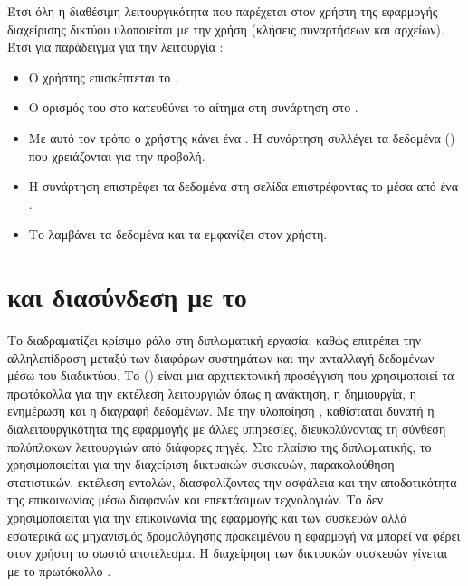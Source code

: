 \FloatBarrier

Έτσι όλη η διαθέσιμη λειτουργικότητα που παρέχεται στον χρήστη της εφαρμογής διαχείρισης δικτύου υλοποιείται με την χρήση  (κλήσεις συναρτήσεων και  αρχείων). Έτσι για παράδειγμα για την λειτουργία  : 

\begin{itemize}
    \item Ο χρήστης επισκέπτεται το  . 
    \item Ο ορισμός του  στο  κατευθύνει το αίτημα στη συνάρτηση  στο .
    \item Με αυτό τον τρόπο ο χρήστης κάνει ένα . Η συνάρτηση  συλλέγει τα δεδομένα () που χρειάζονται για την προβολή.
    \item Η συνάρτηση  επιστρέφει τα δεδομένα στη σελίδα  επιστρέφοντας το μέσα από ένα .
    \item Το   λαμβάνει τα δεδομένα και τα εμφανίζει στον χρήστη.
\end{itemize}


\section{ και διασύνδεση με το }

 Το  διαδραματίζει κρίσιμο ρόλο στη 
διπλωματική εργασία, καθώς επιτρέπει την αλληλεπίδραση μεταξύ των 
διαφόρων συστημάτων και την ανταλλαγή δεδομένων μέσω του διαδικτύου. 
Το  () είναι μια 
αρχιτεκτονική προσέγγιση που χρησιμοποιεί τα πρωτόκολλα  
για την εκτέλεση λειτουργιών όπως η ανάκτηση, η δημιουργία, η 
ενημέρωση και η διαγραφή δεδομένων. Με την υλοποίηση , 
καθίσταται δυνατή η διαλειτουργικότητα της εφαρμογής με άλλες 
υπηρεσίες, διευκολύνοντας τη σύνθεση πολύπλοκων λειτουργιών από 
διάφορες πηγές. Στο πλαίσιο της διπλωματικής, το  
χρησιμοποιείται για την διαχείριση δικτυακών συσκευών, παρακολούθηση 
στατιστικών, εκτέλεση εντολών, διασφαλίζοντας την ασφάλεια και την 
αποδοτικότητα της επικοινωνίας μέσω διαφανών και επεκτάσιμων 
τεχνολογιών. Το  δεν χρησιμοποιείται για την επικοινωνία της εφαρμογής
και των συσκευών αλλά εσωτερικά ως μηχανισμός δρομολόγησης προκειμένου η εφαρμογή
να μπορεί να φέρει στον χρήστη το σωστό αποτέλεσμα. Η διαχείρηση των δικτυακών
συσκευών γίνεται με το πρωτόκολλο .

